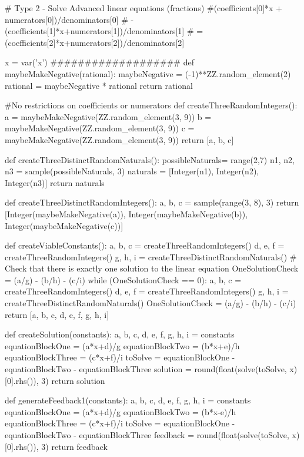 \documentclass{ximera}
\begin{document}
\begin{sagesilent}
# Type 2 - Solve Advanced linear equations (fractions)
#(coefficients[0]*x + numerators[0])/denominators[0]
    # - (coefficients[1]*x+numerators[1])/denominators[1]
    # = (coefficients[2]*x+numerators[2])/denominators[2]

x = var('x')
###################
def maybeMakeNegative(rational):
    maybeNegative = (-1)**ZZ.random_element(2)
    rational = maybeNegative * rational
    return rational

#No restrictions on coefficients or numerators
def createThreeRandomIntegers():
    a = maybeMakeNegative(ZZ.random_element(3, 9))
    b = maybeMakeNegative(ZZ.random_element(3, 9))
    c = maybeMakeNegative(ZZ.random_element(3, 9))
    return [a, b, c]

def createThreeDistinctRandomNaturals():
    possibleNaturals= range(2,7)
    n1, n2, n3 = sample(possibleNaturals, 3)
    naturals = [Integer(n1), Integer(n2), Integer(n3)]
    return naturals

def createThreeDistinctRandomIntegers():
    a, b, c = sample(range(3, 8), 3)
    return [Integer(maybeMakeNegative(a)), Integer(maybeMakeNegative(b)), Integer(maybeMakeNegative(c))]

def createViableConstants():
    a, b, c = createThreeRandomIntegers()
    d, e, f = createThreeRandomIntegers()
    g, h, i = createThreeDistinctRandomNaturals()
    # Check that there is exactly one solution to the linear equation
    OneSolutionCheck = (a/g) - (b/h) - (c/i)
    while (OneSolutionCheck == 0):
        a, b, c = createThreeRandomIntegers()
        d, e, f = createThreeRandomIntegers()
        g, h, i = createThreeDistinctRandomNaturals()
        OneSolutionCheck = (a/g) - (b/h) - (c/i)
    return [a, b, c, d, e, f, g, h, i]

def createSolution(constants):
    a, b, c, d, e, f, g, h, i = constants
    equationBlockOne = (a*x+d)/g
    equationBlockTwo = (b*x+e)/h
    equationBlockThree = (c*x+f)/i
    toSolve = equationBlockOne - equationBlockTwo - equationBlockThree
    solution = round(float(solve(toSolve, x)[0].rhs()), 3)
    return solution
    
def generateFeedback1(constants):
    a, b, c, d, e, f, g, h, i = constants
    equationBlockOne = (a*x+d)/g
    equationBlockTwo = (b*x-e)/h
    equationBlockThree = (c*x+f)/i
    toSolve = equationBlockOne - equationBlockTwo - equationBlockThree
    feedback = round(float(solve(toSolve, x)[0].rhs()), 3)
    return feedback
    

\end{sagesilent}
\end{document}

